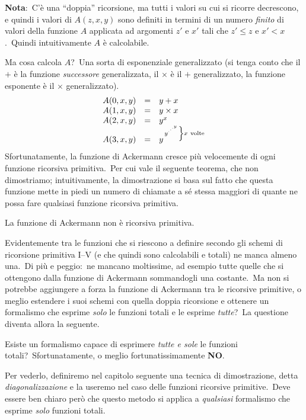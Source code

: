\noindent\textbf{Nota}:\ C'è una ``doppia'' ricorsione, ma tutti i valori su cui si ricorre decrescono, e quindi i valori di $A(z,x,y)$ sono definiti in termini di un numero \textit{finito} di valori della funzione $A$ applicata ad argomenti $z'$ e $x'$ tali che $z' \leq z$ e $x' < x$.\
Quindi intuitivamente $A$ è calcolabile.\

Ma cosa calcola $A$?\
Una sorta di esponenziale generalizzato (si tenga conto che il $+$ è la funzione \textit{successore} generalizzata, il $\times$ è il $+$ generalizzato, la funzione esponente è il $\times$ generalizzato).\
\[
    \begin{array}{l c l}
        A(0,x,y) & = & y + x                                                            \\
        A(1,x,y) & = & y \times x                                                       \\
        A(2,x,y) & = & y^x                                                              \\
        A(3,x,y) & = & y^{\left.y^{\cdot^{\cdot^{\cdot^{y}}}}\right\}x\ \mathrm{volte}} \\
    \end{array}
\]
Sfortunatamente, la funzione di Ackermann cresce più velocemente di ogni funzione ricorsiva primitiva.\
Per cui vale il seguente teorema, che non dimostriamo; intuitivamente, la dimostrazione si basa sul fatto che questa funzione mette in piedi un numero di chiamate a sé stessa maggiori di quante ne possa fare qualsiasi funzione ricorsiva primitiva.

\begin{theorem}
    La funzione di Ackermann non è ricorsiva primitiva.
\end{theorem}

\noindent Evidentemente tra le funzioni che si riescono a definire secondo gli schemi di ricorsione primitiva I–V (e che quindi sono calcolabili e totali) ne manca almeno una.\
Di più e peggio:\ ne mancano moltissime, ad esempio tutte quelle che si ottengono dalla funzione di Ackermann sommandogli una costante.\
Ma non si potrebbe aggiungere a forza la funzione di Ackermann tra le ricorsive primitive, o meglio estendere i suoi schemi con quella doppia ricorsione e ottenere un formalismo che esprime \textit{solo} le funzioni totali e le esprime \textit{tutte}?\
La questione diventa allora la seguente.

\begin{question}
    Esiste un formalismo capace di esprimere \textit{tutte e sole} le funzioni totali?\
    Sfortunatamente, o meglio fortunatissimamente \textbf{NO}.\
\end{question}

\noindent Per vederlo, definiremo nel capitolo seguente una tecnica di dimostrazione, detta \textit{diagonalizzazione} e la useremo nel caso delle funzioni ricorsive primitive.\
Deve essere ben chiaro però che questo metodo si applica a \textit{qualsiasi} formalismo che esprime \textit{solo} funzioni totali.
